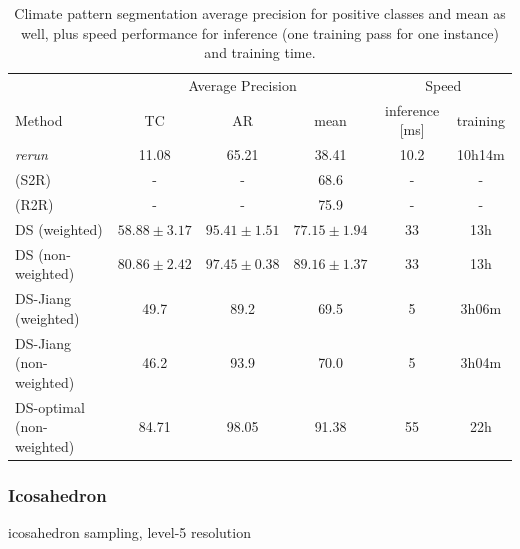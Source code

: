 \documentclass{article} %
\begin{document}
\begin{table}
\begin{tabular}{l|c c c c c}
        \multicolumn{1}{l}{} & \multicolumn{3}{c}{Average Precision} & \multicolumn{2}{c}{Speed}\\
        \cmidrule(lr){2-4}\cmidrule(lr){5-6}
        \multicolumn{1}{l}{Method} & TC & AR & mean & inference [ms] & training \\ \hline
        \cite{jiang_spherical_2019} \emph{rerun} & 11.08 & 65.21 & 38.41 & 10.2 & 10h14m\\
        \cite{cohen_gauge_2019} (S2R) & - & -& 68.6 & - & - \\
        \cite{cohen_gauge_2019} (R2R) & - & -& 75.9 & - & -\\ \hline
        DS (weighted) & $58.88\pm 3.17$ & $95.41\pm 1.51$ & $77.15\pm 1.94$ & 33 & 13h \\
        DS (non-weighted) & $80.86\pm 2.42$ & $97.45\pm 0.38$ & $89.16\pm 1.37$ & 33 & 13h \\ \hline
        DS-Jiang (weighted) & 49.7 & 89.2 & 69.5 & 5 & 3h06m\\
        DS-Jiang (non-weighted) & 46.2 & 93.9 & 70.0 & 5 & 3h04m \\ \hline
        DS-optimal (non-weighted) & 84.71 & 98.05 & 91.38 & 55 & 22h \\
    \end{tabular}
    \caption{Climate pattern segmentation average precision for positive classes and mean as well, plus speed performance for inference (one training pass for one instance)  and training time.}
\end{table}

\subsubsection*{Icosahedron}

icosahedron sampling, level-5 resolution
\end{document}
